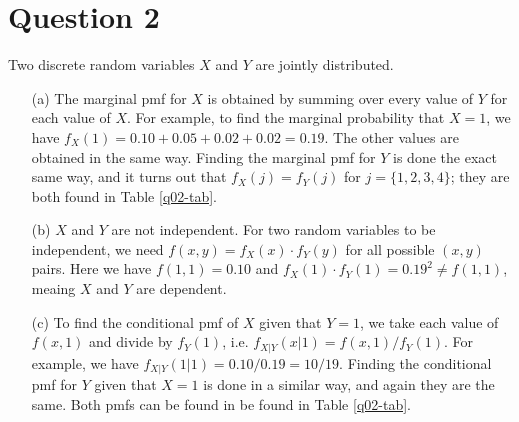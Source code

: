 \documentclass[10pt]{article}
\begin{document}
\section{Question 2} \noindent
Two discrete random variables \(X\) and \(Y\) are jointly distributed. 
\begin{itemize}
    \item[(a)] The marginal pmf for \(X\) is obtained by summing over every value of \(Y\) for each value of \(X\).
    For example, to find the marginal probability that \(X=1\), we have \(f_X(1) = 0.10 + 0.05 + 0.02 + 0.02 = 0.19\). 
    The other values are obtained in the same way. Finding the marginal pmf for \(Y\) is done the exact same way, and 
    it turns out that \(f_X(j) = f_Y(j)\) for \(j = \{1,2,3,4\}\); they are both found in Table \ref{q02-tab}.
    \item[(b)] \(X\) and \(Y\) are not independent. For two random variables to be independent, we need \(f(x,y) = f_X(x)\cdot f_Y(y)\)
    for all possible \((x,y)\) pairs. Here we have \(f(1,1) = 0.10\) and \(f_X(1)\cdot f_Y(1) = 0.19^2 \neq f(1,1)\), meaing 
    \(X\) and \(Y\) are dependent. 
    \item[(c)] To find the conditional pmf of \(X\) given that \(Y=1\), we take each value of \(f(x,1)\) and divide by \(f_Y(1)\), 
    i.e. \(f_{X|Y}(x|1) = f(x,1) / f_Y(1)\). For example, we have \(f_{X|Y}(1|1) = 0.10 / 0.19 = 10/19\). Finding the conditional pmf for 
    \(Y\) given that \(X = 1\) is done in a similar way, and again they are the same. 
    Both pmfs can be found in be found in Table \ref{q02-tab}.
\end{itemize}

\end{document}
